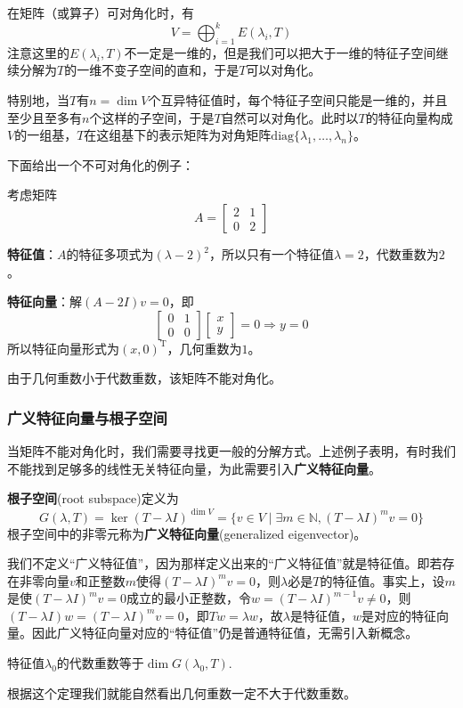 在矩阵（或算子）可对角化时，有
\[
V = \bigoplus_{i=1}^{k} E(\lambda_i, T)
\]
注意这里的$E(\lambda_i, T)$不一定是一维的，但是我们可以把大于一维的特征子空间继续分解为$T$的一维不变子空间的直和，于是$T$可以对角化。

特别地，当$T$有$n = \dim V$个互异特征值时，每个特征子空间只能是一维的，并且至少且至多有$n$个这样的子空间，于是$T$自然可以对角化。此时以$T$的特征向量构成$V$的一组基，$T$在这组基下的表示矩阵为对角矩阵$\mathrm{diag}\{\lambda_1, \ldots, \lambda_n\}$。

下面给出一个不可对角化的例子：

\begin{example}
考虑矩阵
\[
A = \begin{bmatrix} 2 & 1 \\ 0 & 2 \end{bmatrix}
\]

\textbf{特征值}：$A$的特征多项式为$(\lambda - 2)^2$，所以只有一个特征值$\lambda = 2$，代数重数为$2$。

\textbf{特征向量}：解$(A - 2I)v = 0$，即
\[
\begin{bmatrix} 0 & 1 \\ 0 & 0 \end{bmatrix}\begin{bmatrix} x \\ y \end{bmatrix} = 0 \Rightarrow y = 0
\]
所以特征向量形式为$(x, 0)^{\mathrm{T}}$，几何重数为$1$。

由于几何重数小于代数重数，该矩阵不能对角化。
\end{example}


\subsubsection{广义特征向量与根子空间}

当矩阵不能对角化时，我们需要寻找更一般的分解方式。上述例子表明，有时我们不能找到足够多的线性无关特征向量，为此需要引入\textbf{广义特征向量}。

\begin{definition}[根子空间]
\textbf{根子空间}(root subspace)定义为
\[
G(\lambda, T) = \ker(T - \lambda I)^{\dim V} = \{v \in V \mid \exists m \in \mathbb{N}, (T - \lambda I)^m v = 0\}
\]
根子空间中的非零元称为\textbf{广义特征向量}(generalized eigenvector)。
\end{definition}

我们不定义“广义特征值”，因为那样定义出来的“广义特征值”就是特征值。即若存在非零向量$v$和正整数$m$使得$(T - \lambda I)^m v = 0$，则$\lambda$必是$T$的特征值。事实上，设$m$是使$(T - \lambda I)^m v = 0$成立的最小正整数，令$w = (T - \lambda I)^{m-1}v \neq 0$，则$(T - \lambda I)w = (T - \lambda I)^m v = 0$，即$Tw = \lambda w$，故$\lambda$是特征值，$w$是对应的特征向量。因此广义特征向量对应的“特征值”仍是普通特征值，无需引入新概念。
\begin{theorem}
特征值$\lambda_0$的代数重数等于$\dim G(\lambda_0, T)$.
\end{theorem}
根据这个定理我们就能自然看出几何重数一定不大于代数重数。

